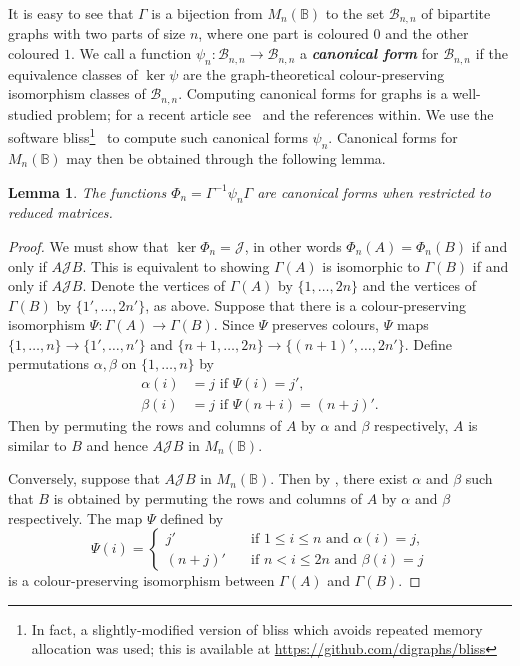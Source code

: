 \documentclass[11pt]{article}
\newtheorem{lemma}[thm]{Lemma}
\newcommand{\defn}[1]{\textbf{\textit{#1}}}
\numberwithin{equation}{section}
\renewcommand{\to}{\longrightarrow}
\newcommand{\B}{\mathbb{B}}
\newcommand{\Bn}{M_n(\B)}
\newcommand{\J}{\mathscr{J}}
\newcommand{\BGSet}{\mathcal{B}_{n,n}}
\begin{document}
It is easy to see that $\Gamma$ is a bijection from $\Bn$ to the set $\BGSet$ of
bipartite graphs with two parts of size $n$, where one part is coloured $0$ and
the other coloured $1$. We call a function $\psi_n: \BGSet \to \BGSet$ a
\defn{canonical form} for $\BGSet$ if the equivalence classes of $\ker\psi$ are
the graph-theoretical colour-preserving isomorphism classes of $\BGSet$.
Computing canonical forms for graphs is a well-studied problem; for a recent
article see~\cite{McKay2013aa} and the references within. 
We use the software bliss\footnote{In fact, a slightly-modified version of bliss
  which avoids repeated memory allocation was used; this is available at
  \url{https://github.com/digraphs/bliss}}~\cite{Junttila2007aa, Bliss} to
compute such canonical forms $\psi_n$. Canonical forms for $\Bn$ may then be
obtained through the following lemma.
\begin{lemma}
  The functions $\Phi_n = \Gamma^{-1}\psi_n\Gamma$ are canonical forms when
  restricted to reduced matrices. 
\end{lemma}
\begin{proof}
  We must show that $\ker\Phi_n = \J$, in other words $\Phi_n(A) = \Phi_n(B)$ if and
  only if $A\J B$. This is equivalent to showing $\Gamma(A)$ is isomorphic to
  $\Gamma(B)$ if and only if $A \J B$. Denote the vertices of $\Gamma(A)$ by
  $\{1, \ldots, 2 n\}$ and the vertices of $\Gamma(B)$ by $\{1', \ldots, 2n'\}$,
  as above.
  Suppose that there is a colour-preserving isomorphism $\Psi: \Gamma(A) \to
  \Gamma(B)$. Since $\Psi$ preserves colours, $\Psi$ maps $\{1, \ldots, n\} \to
  \{1', \ldots, n'\}$ and $\{n + 1, \ldots, 2n\} \to \{(n + 1)', \ldots, 2n'\}$.
  Define permutations $\alpha, \beta$ on $\{1,\ldots, n\}$ by 
  \begin{align*}
    \alpha(i) &= j \text{ if } \Psi(i) = j',\\
    \beta(i)  &= j \text{ if } \Psi(n + i) = (n + j)'.
  \end{align*}
  Then by permuting the rows and columns of $A$ by $\alpha$ and $\beta$
  respectively, $A$ is similar to $B$ and hence $A \J B$ in $\Bn$.

  Conversely, suppose that $A \J B$ in $\Bn$. Then by
  , there exist $\alpha$ and $\beta$ such
  that $B$ is obtained by permuting the rows and columns of $A$ by $\alpha$ and $\beta$
  respectively. The map $\Psi$ defined by
  \[\Psi(i) = \begin{cases}
      j' \quad &\text{if } 1 \leq i \leq n \text{ and }\alpha(i) = j, \\
      (n + j)' \quad &\text{if } n < i \leq 2n \text{ and }\beta(i) = j
    \end{cases}
  \]
  is a colour-preserving isomorphism between $\Gamma(A)$ and $\Gamma(B)$.
\end{proof}
\end{document}

